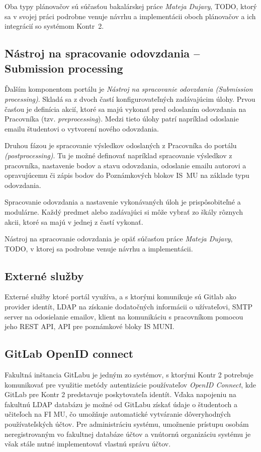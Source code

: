 \documentclass[
  digital, %
  twoside, %
  table,   %
  lof,     %
  lot,     %
]{fithesis3}
\begin{document}
Oba typy plánovačov sú súčasťou bakalárskej práce \emph{Mateja Dujavy}, TODO, ktorý sa v svojej práci podrobne venuje návrhu a implementácii oboch plánovačov a ich integrácií so systémom Kontr~2.

\subsection{Nástroj na spracovanie odovzdania -- Submission processing}

Ďalším komponentom portálu je \emph{Nástroj na spracovanie odovzdania (Submission processing)}. Skladá sa z dvoch častí konfigurovateľných zadávajúcim úlohy. Prvou časťou je definícia akcií, ktoré sa majú vykonať pred odoslaním odovzdania na Pracovníka (tzv. \emph{preprocessing}). Medzi tieto úlohy patrí napríklad odoslanie emailu študentovi o vytvorení nového odovzdania.

Druhou fázou je spracovanie výsledkov odoslaných z Pracovníka do portálu \emph{(postprocessing)}. Tu je možné definovať napríklad spracovanie výsledkov z pracovníka, nastavenie bodov a stavu odovzdania, odoslanie emailu autorovi a opravujúcemu či zápis bodov do Poznámkových blokov IS~MU na základe typu odovzdania. 

Spracovanie odovzdania a nastavenie vykonávaných úloh je prispôsobiteľné a modulárne. Každý predmet alebo zadávajúci si môže vybrať zo škály rôznych akcii, ktoré sa majú v jednej z častí vykonať.

Nástroj na spracovanie odovzdania je opäť súčasťou práce \emph{Mateja Dujavy}, TODO, v ktorej sa podrobne venuje návrhu a implementácii.

\subsection{Externé služby}

Externé služby ktoré portál využíva, a s ktorými komunikuje sú Gitlab ako provider identít, LDAP na získanie dodatočných informácii o užívateľovi, SMTP server na odosielanie emailov, klient na komunikáciu s pracovníkom pomocou jeho REST API, API pre poznámkové bloky IS MUNI. 


\subsection{GitLab OpenID connect}

Fakultná inštancia GitLabu je jedným zo systémov, s ktorými Kontr 2 potrebuje komunikovať pre využitie metódy autentizácie používateľov \emph{OpenID Connect}, kde GitLab pre Kontr 2 predstavuje poskytovateľa identít. Vďaka napojeniu na fakultnú LDAP databázu je možné od GitLabu získať údaje o študentoch a učiteľoch na FI MU, čo umožňuje automatické vytváranie dôveryhodných používateľských účtov. Pre administráciu systému, umožnenie prístupu osobám neregistrovaným vo fakultnej databáze účtov a vnútornú organizáciu systému je však stále nutné implementovať vlastnú správu účtov. 
\end{document}
